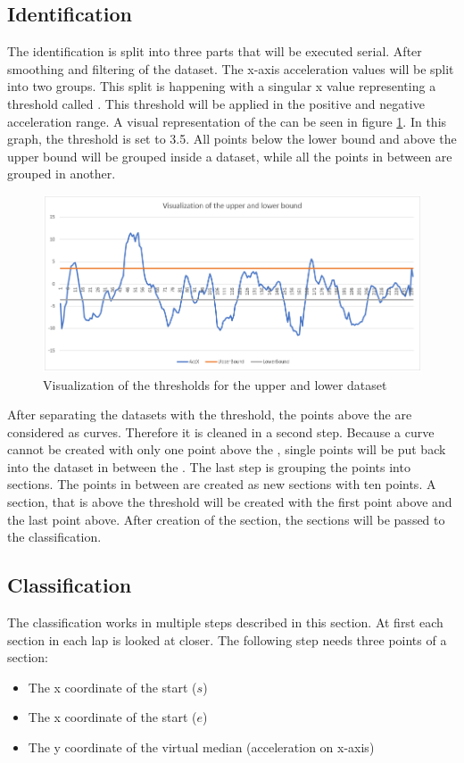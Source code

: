 \subsection{Identification}\label{identification}
The identification is split into three parts that will be executed serial. After smoothing and filtering of the dataset. The x-axis acceleration values will be split into two groups. This split is happening with a singular x value representing a threshold called . This threshold will be applied in the positive and negative acceleration range. A visual representation of the  can be seen in figure \ref{upperlowerBound}. In this graph, the threshold is set to 3.5. All points below the lower bound and above the upper bound will be grouped inside a dataset, while all the points in between are grouped in another.
\begin{figure}[H]
	\centering
	\includegraphics[scale= 0.6]{Pictures/upperandlowerbound.png}
	\caption{Visualization of the thresholds for the upper and lower dataset}
	\label{upperlowerBound}
\end{figure}
After separating the datasets with the threshold, the points above the  are considered as curves. Therefore it is cleaned in a second step. Because a curve cannot be created with only one point above the , single points will be put back into the dataset in between the . The last step is grouping the points into sections. The points in between are created as new sections with ten points. A section, that is above the threshold will be created with the first point above and the last point above. After creation of the section, the sections will be passed to the classification.

\subsection{Classification}\label{classification}
The classification works in multiple steps described in this section. At first each section in each lap is looked at closer. The following step needs three points of a section:
\begin{itemize}
	\item The x coordinate of the start ($s$)
	\item The x coordinate of the start ($e$)
	\item The y coordinate of the virtual median (acceleration on x-axis)
\end{itemize}

